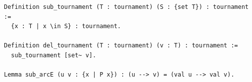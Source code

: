 \begin{lstlisting}[language=Rocq]
Definition sub_tournament (T : tournament) (S : {set T}) : tournament :=
  {x : T | x \in S} : tournament.

Definition del_tournament (T : tournament) (v : T) : tournament :=
  sub_tournament [set~ v].

Lemma sub_arcE (u v : {x | P x}) : (u --> v) = (val u --> val v).
\end{lstlisting}
